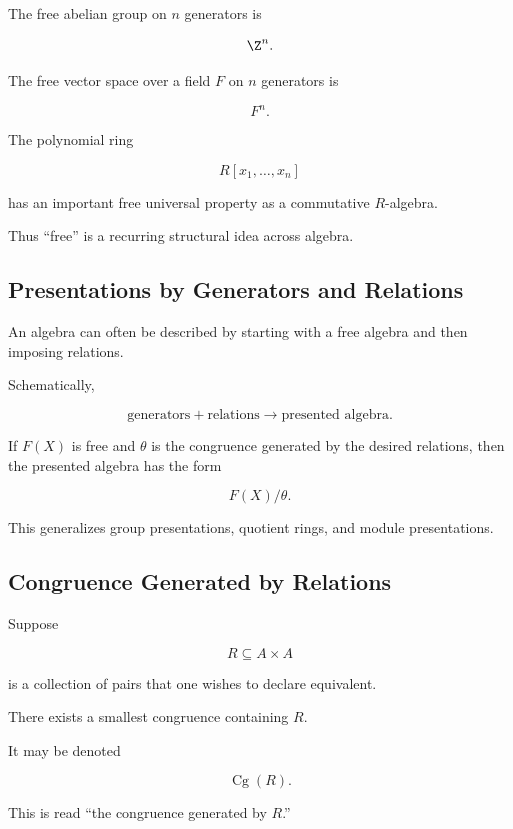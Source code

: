 The free abelian group on \(n\) generators is

\[ \Z^n. \]

The free vector space over a field \(F\) on \(n\) generators is

\[ F^n. \]

The polynomial ring

\[ R[x_1,\ldots,x_n] \]

has an important free universal property as a commutative \(R\)-algebra.

Thus ``free'' is a recurring structural idea across algebra.

\subsection{Presentations by Generators and Relations}
\label{subsec:universal-presentations}

An algebra can often be described by starting with a free algebra and then
imposing relations.

Schematically,

\[ \boxed{\text{generators}+\text{relations}
\longrightarrow\text{presented algebra}.} \]

If \(F(X)\) is free and \(\theta\) is the congruence generated by the desired
relations, then the presented algebra has the form

\[ F(X)/\theta. \]

This generalizes group presentations, quotient rings, and module
presentations.

\subsection{Congruence Generated by Relations}
\label{subsec:generated-congruence}

Suppose

\[ R\subseteq A\times A \]

is a collection of pairs that one wishes to declare equivalent.

There exists a smallest congruence containing \(R\).

It may be denoted

\[ \operatorname{Cg}(R). \]

This is read ``the congruence generated by \(R\).''

